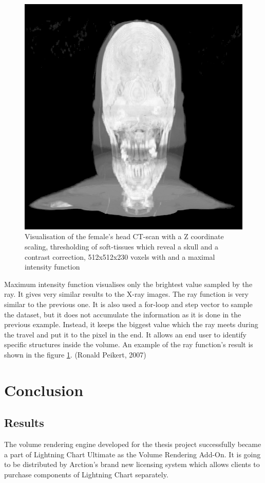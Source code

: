 \documentclass[twoside, english, 11pt]{report}
\begin{document}
\begin{figure}[!h]
\centerline{\includegraphics[scale = 0.6]{img/maxi}}
\caption{Visualisation of the female's head CT-scan with a Z coordinate scaling, thresholding of soft-tissues which reveal a skull and a contrast correction, 512x512x230 voxels with and a maximal intensity function\label{fig:maxi}}
\end{figure}

Maximum intensity function visualises only the brightest value sampled by the ray. It gives very similar results to the X-ray images. The ray function is very similar to the previous one. It is also used a for-loop and step vector to sample the dataset, but it does not accumulate the information as it is done in the previous example. Instead, it keeps the biggest value which the ray meets during the travel and put it to the pixel in the end. It allows an end user to identify specific structures inside the volume. An example of the ray function's result is shown in the figure \ref{fig:maxi}. (Ronald Peikert, 2007)

\chapter{Conclusion}
\section{Results}
The volume rendering engine developed for the thesis project successfully became a part of Lightning Chart Ultimate as the Volume Rendering Add-On. It is going to be distributed by Arction's brand new licensing system which allows clients to purchase components of Lightning Chart separately.\\
\end{document}
